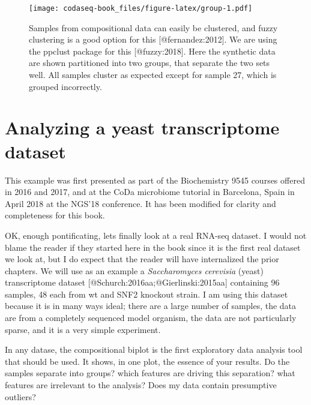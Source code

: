 \documentclass[
  onecolumn]{article}
\begin{document}
\begin{figure}
\centering
\texttt{[image: codaseq-book\_files/figure-latex/group-1.pdf]}
\caption{\label{fig:group}Samples from compositional data can easily be clustered, and fuzzy clustering is a good option for this {[}@fernandez:2012{]}. We are using the ppclust package for this {[}@fuzzy:2018{]}. Here the synthetic data are shown partitioned into two groups, that separate the two sets well. All samples cluster as expected except for sample 27, which is grouped incorrectly.}
\end{figure}

\hypertarget{analyzing-a-yeast-transcriptome-dataset}{%
\section{Analyzing a yeast transcriptome dataset}\label{analyzing-a-yeast-transcriptome-dataset}}

\hspace{2cm}\begin{minipage}[ct]{10cm}
\parskip=5pt
\parindent=5pt
This example was first presented as part of the Biochemistry 9545 courses offered in 2016 and 2017, and at the CoDa microbiome tutorial in Barcelona, Spain in April 2018 at the NGS'18 conference.  It has been modified for clarity and completeness for this book.
\end{minipage}
\vspace{1cm}

OK, enough pontificating, lets finally look at a real RNA-seq dataset. I would not blame the reader if they started here in the book since it is the first real dataset we look at, but I do expect that the reader will have internalized the prior chapters. We will use as an example a \emph{Saccharomyces cerevisia} (yeast) transcriptome dataset {[}@Schurch:2016aa;@Gierlinski:2015aa{]} containing 96 samples, 48 each from wt and SNF2 knockout strain. I am using this dataset because it is in many ways ideal; there are a large number of samples, the data are from a completely sequenced model organism, the data are not particularly sparse, and it is a very simple experiment.

In any datase, the compositional biplot is the first exploratory data analysis tool that should be used. It shows, in one plot, the essence of your results. Do the samples separate into groups? which features are driving this separation? what features are irrelevant to the analysis? Does my data contain presumptive outliers?
\end{document}
